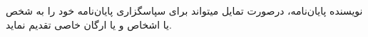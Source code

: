 \begin{acknowledgementpage}

\vspace{1.5cm}

{\nastaliq
{
 نويسنده پايان‌نامه، درصورت تمايل ميتواند برای سپاسگزاری پايان‌نامه خود را به شخص يا اشخاص و يا ارگان خاصی تقدیم نماید.
}}\end{acknowledgementpage}
\newpage